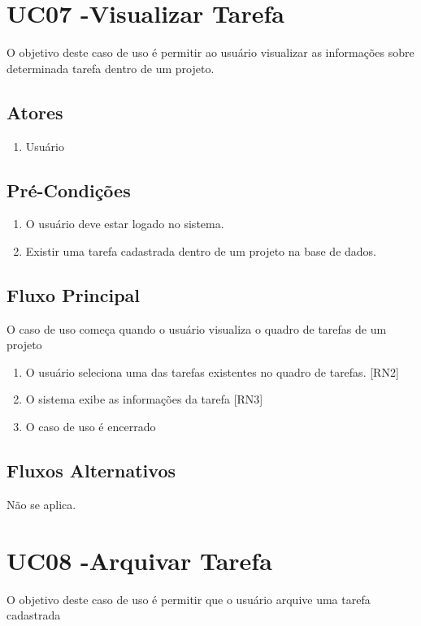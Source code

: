 \section{UC07 -Visualizar Tarefa}
O objetivo deste caso de uso é permitir ao usuário visualizar as informações sobre determinada tarefa dentro de um projeto.

\subsection{Atores}

\begin{enumerate}
  \item Usuário
\end{enumerate}

\subsection{Pré-Condições}
\begin{enumerate}
  \item O usuário deve estar logado no sistema.
  \item Existir uma tarefa cadastrada dentro de um projeto na base de dados.
\end{enumerate}

\subsection{Fluxo Principal}
O caso de uso começa quando o usuário visualiza o quadro de tarefas de um projeto

\begin{enumerate}
  \item O usuário seleciona uma das tarefas existentes no quadro de tarefas. [RN2]
  \item O sistema exibe as informações da tarefa [RN3]
  \item O caso de uso é encerrado
\end{enumerate}

\subsection{Fluxos Alternativos}
Não se aplica.

\section{UC08 -Arquivar Tarefa}
O objetivo deste caso de uso é permitir que o usuário arquive uma tarefa cadastrada

